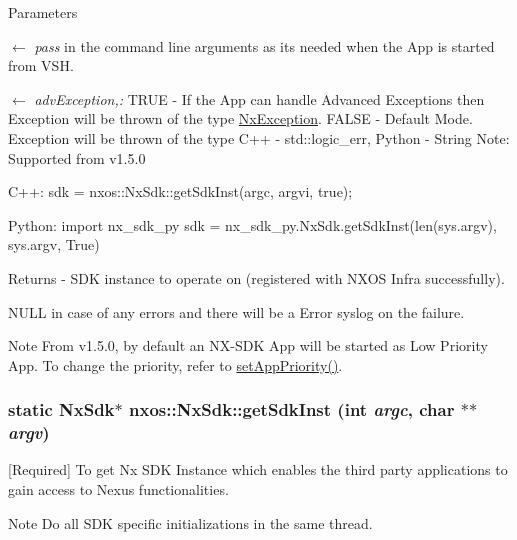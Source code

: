 \begin{DoxyParams}{Parameters}
\item[\mbox{$\leftarrow$} {\em pass}]in the command line arguments as its needed when the App is started from VSH. \item[\mbox{$\leftarrow$} {\em advException,:}]TRUE -\/ If the App can handle Advanced Exceptions then Exception will be thrown of the type \hyperlink{classnxos_1_1NxException}{NxException}. FALSE -\/ Default Mode. Exception will be thrown of the type C++ -\/ std::logic\_\-err, Python -\/ String Note: Supported from v1.5.0\end{DoxyParams}

\begin{DoxyCode}
  C++:
       sdk = nxos::NxSdk::getSdkInst(argc, argvi, true);

  Python:
       import nx_sdk_py
       sdk = nx_sdk_py.NxSdk.getSdkInst(len(sys.argv), sys.argv, True)
\end{DoxyCode}


\begin{DoxyReturn}{Returns}
-\/ SDK instance to operate on (registered with NXOS Infra successfully).
\begin{DoxyItemize}
\item NULL in case of any errors and there will be a Error syslog on the failure.
\end{DoxyItemize}
\end{DoxyReturn}
\begin{DoxyNote}{Note}
From v1.5.0, by default an NX-\/SDK App will be started as Low Priority App. To change the priority, refer to \hyperlink{classnxos_1_1NxSdk_a46d9487216506aa19e5499759f5eaef7}{setAppPriority()}. 
\end{DoxyNote}
\hypertarget{classnxos_1_1NxSdk_a5050e2d26c40744b4fc7862068a83f39}{
\subsubsection[{getSdkInst}]{\setlength{\rightskip}{0pt plus 5cm}static {\bf NxSdk}$\ast$ nxos::NxSdk::getSdkInst (int {\em argc}, \/  char $\ast$$\ast$ {\em argv})}}
\label{classnxos_1_1NxSdk_a5050e2d26c40744b4fc7862068a83f39}
\mbox{[}Required\mbox{]} To get Nx SDK Instance which enables the third party applications to gain access to Nexus functionalities. \begin{DoxyNote}{Note}
Do all SDK specific initializations in the same thread. 
\end{DoxyNote}

